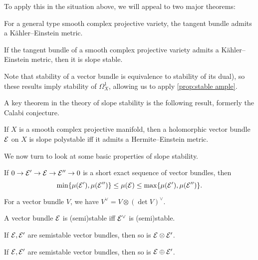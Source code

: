 

To apply this in the situation above, we will appeal to two major theorems:


\begin{theorem}
    For a general type smooth complex projective variety, the tangent bundle
    admits a K\"ahler--Einstein metric.
\end{theorem}

\begin{theorem}
    If the tangent bundle of a smooth complex projective variety admits a
    K\"ahler--Einstein metric, then it is slope stable.
\end{theorem}

Note that stability of a vector bundle is equivalence to stability of its dual),
so these results imply stability of $\Omega^1_X$, allowing us to apply
\cref{prop:stable ample}.

A key theorem in the theory of slope stability is the following result, formerly
the Calabi conjecture.

\begin{theorem} %
    If $X$ is a smooth complex projective manifold, then a holomorphic vector
    bundle $\mathcal{E}$ on $X$ is slope polystable iff it admits a Hermite--Einstein
    metric.
\end{theorem}

We now turn to look at some basic properties of slope stability.

\begin{proposition}
    If $0\to\mathcal{E}'\to\mathcal{E}\to\mathcal{E}''\to0$ is a short exact sequence of vector
    bundles, then
    \begin{equation*}
        \min\{\mu(\mathcal{E}'),\mu(\mathcal{E}'')\}
            \le \mu(\mathcal{E}) \le \max\{\mu(\mathcal{E}'),\mu(\mathcal{E}'')\}.
    \end{equation*}
\end{proposition}

\begin{lemma}
    For a vector bundle $V$, we have $V^\vee=V\otimes(\det V)^\vee$.
\end{lemma}

\begin{proposition}
    A vector bundle $\mathcal{E}$ is (semi)stable iff $\mathcal{E}^\vee$ is (semi)stable.
\end{proposition}

\begin{proposition}
    If $\mathcal{E},\mathcal{E}'$ are semistable vector bundles, then so is
    $\mathcal{E}\otimes\mathcal{E}'$.
\end{proposition}

\begin{proposition}
    If $\mathcal{E},\mathcal{E}'$ are semistable vector bundles, then so is
    $\mathcal{E}\oplus\mathcal{E}'$.
\end{proposition}
